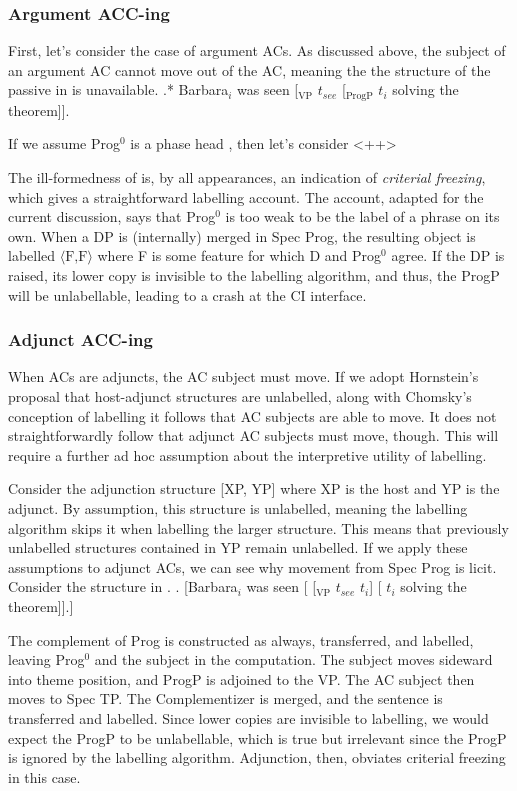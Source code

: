 \documentclass[letterpaper]{article}
\begin{document}
\subsubsection{Argument ACC-ing}
First, let's consider the case of argument ACs.
As discussed above, the subject of an argument AC cannot move out of the AC, meaning the the structure of the passive in \Next is unavailable.
\ex.* Barbara$_i$ was seen [$_\text{VP}$ $t_{see}$ [$_\text{ProgP}$ $t_i$  solving the theorem]].

If we assume Prog$^0$ is a phase head \parencite{harwood2015being}, then let's consider <++>

The ill-formedness of \Last is, by all appearances, an indication of \textit{criterial freezing}, which \textcite{chomsky2015problems} gives a straightforward labelling account.
The account, adapted for the current discussion, says that Prog$^0$ is too weak to be the label of a phrase on its own.
When a DP is (internally) merged in Spec Prog, the resulting object is labelled $\langle\text{F,F}\rangle$ where F is some feature for which D and Prog$^0$ agree.
If the DP is raised, its lower copy is invisible to the labelling algorithm, and thus, the ProgP will be unlabellable, leading to a crash at the CI interface.

\subsubsection{Adjunct ACC-ing}
When ACs are adjuncts, the AC subject must move.
If we adopt Hornstein's proposal that host-adjunct structures are unlabelled, along with Chomsky's conception of labelling it follows that AC subjects are able to move.
It does not straightforwardly follow that adjunct AC subjects must move, though.
This will require a further ad hoc assumption about the interpretive utility of labelling.

Consider the adjunction structure [XP, YP] where XP is the host and YP is the adjunct.
By assumption, this structure is unlabelled, meaning the labelling algorithm skips it when labelling the larger structure.
This means that previously unlabelled structures contained in YP remain unlabelled.
If we apply these assumptions to adjunct ACs, we can see why movement from Spec Prog is licit.
Consider the structure in \Next.
\ex. [Barbara$_i$ was seen [ [$_\text{VP}$ $t_{see}$ $t_i$] [ $t_i$ solving the theorem]].]

The complement of Prog is constructed as always, transferred, and labelled, leaving Prog$^0$ and the subject in the computation.
The subject moves sideward into theme position, and ProgP is adjoined to the VP.
The AC subject then moves to Spec TP.
The Complementizer is merged, and the sentence is transferred and labelled.
Since lower copies are invisible to labelling, we would expect the ProgP to be unlabellable, which is true but irrelevant since the ProgP is ignored by the labelling algorithm.
Adjunction, then, obviates criterial freezing in this case.
\end{document}

